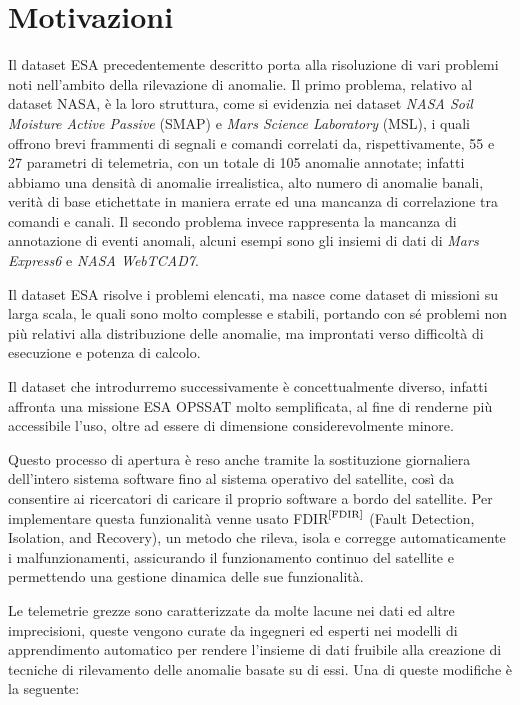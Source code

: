 \section{Motivazioni}
Il dataset ESA precedentemente descritto porta alla risoluzione di vari problemi noti nell'ambito della rilevazione di anomalie.
Il primo problema, relativo al dataset NASA, è la loro struttura, come si evidenzia nei dataset \textit{NASA Soil Moisture Active Passive} (SMAP) e  \textit{Mars Science Laboratory} (MSL), i quali offrono brevi frammenti di segnali e comandi correlati da, rispettivamente, 55 e 27 parametri di telemetria, con un totale di 105 anomalie annotate; infatti abbiamo una densità di anomalie irrealistica, alto numero di anomalie banali, verità di base etichettate in maniera errate ed una mancanza di correlazione tra comandi e canali. 
Il secondo problema invece rappresenta la mancanza di annotazione di eventi anomali, alcuni esempi sono gli insiemi di dati di \textit{Mars Express6} e \textit{NASA WebTCAD7}.

Il dataset ESA risolve i problemi elencati, ma nasce come dataset di missioni su larga scala, le quali sono molto complesse e stabili, portando con sé problemi non più relativi alla distribuzione delle anomalie, ma improntati verso difficoltà di esecuzione e potenza di calcolo.

Il dataset che introdurremo successivamente è concettualmente diverso, infatti affronta una missione ESA OPS\textunderscore SAT molto semplificata, al fine di renderne più accessibile l'uso, oltre ad essere di dimensione considerevolmente minore.

Questo processo di apertura è reso anche tramite la sostituzione giornaliera dell'intero sistema software fino al sistema operativo del satellite, così da consentire ai ricercatori di caricare il proprio software a bordo del satellite. Per implementare questa funzionalità venne usato FDIR$^{\text{\cite{FDIR}}}$ (Fault Detection, Isolation, and Recovery), un metodo che rileva, isola e corregge automaticamente i malfunzionamenti, assicurando il funzionamento continuo del satellite e permettendo una gestione dinamica delle sue funzionalità.

Le telemetrie grezze sono caratterizzate da molte lacune nei dati ed altre imprecisioni, queste vengono curate da ingegneri ed esperti nei modelli di apprendimento automatico per rendere l'insieme di dati fruibile alla creazione di tecniche di rilevamento delle anomalie basate su di essi.
Una di queste modifiche è la seguente:

